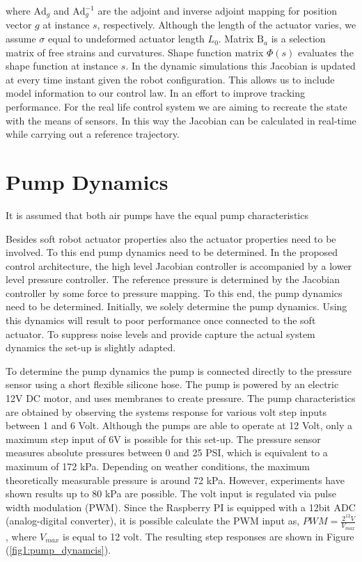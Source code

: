 where $\text{Ad}_g$ and  $\text{Ad}^{-1}_g$ are the adjoint and inverse adjoint mapping for position vector $g$ at instance $s$, respectively. Although the length of the actuator varies, we assume $\sigma$ equal to undeformed actuator length $L_0$. Matrix $\text{B}_a$ is a selection matrix of free strains and curvatures. Shape function matrix $\Phi(s)$ evaluates the shape function at instance $s$. In the dynamic simulations this Jacobian is updated at every time instant given the robot configuration. This allows us to include model information to our control law.  In an effort to improve tracking performance. For the real life control system we are aiming to recreate the state with the means of sensors. In this way the Jacobian can be calculated in real-time while carrying out a reference trajectory.













\section{Pump Dynamics}


\begin{theorem}
It is assumed that both air pumps have the equal pump characteristics
\end{theorem}


Besides soft robot actuator properties also the actuator properties need to be involved. To this end pump dynamics need to be determined. In the proposed control architecture, the high level Jacobian controller is accompanied by a lower level pressure controller. The reference pressure is determined by the Jacobian controller by some force to pressure mapping. To this end, the pump dynamics need to be determined. Initially, we solely determine the pump dynamics. Using this dynamics will result to poor performance once connected to the soft actuator. To suppress noise levels and provide capture the actual system dynamics the set-up is slightly adapted.

To determine the pump dynamics the pump is connected directly to the pressure sensor using a short flexible silicone hose. The pump is powered by an electric 12V DC motor, and uses membranes to create pressure. The pump characteristics are obtained by observing the systems response for various volt step inputs between 1 and 6 Volt. Although the pumps are able to operate at 12 Volt, only a maximum step input of 6V is possible for this set-up. The pressure sensor measures absolute pressures between 0 and 25 PSI, which is equivalent to a maximum of 172 kPa. Depending on weather conditions, the maximum theoretically measurable pressure is around 72 kPa. However, experiments have shown results up to 80 kPa are possible. The volt input is regulated via pulse width modulation (PWM). Since the Raspberry PI is equipped with a 12bit ADC (analog-digital converter), it is possible calculate the PWM input as, $\textit{PWM} = \frac{2^{12} V}{V_{max}} $, where $V_{max}$ is equal to 12 volt.  The resulting step responses are shown in Figure (\ref{fig1:pump_dynamcis}).

